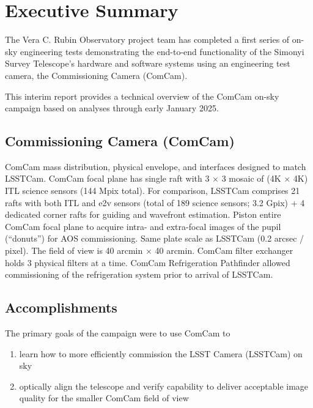 \section{Executive Summary}
\label{sec:summary}

The Vera C. Rubin Observatory project team has completed a first series of on-sky engineering tests demonstrating the end-to-end functionality of the Simonyi Survey Telescope's hardware and software systems using an engineering test camera, the Commissioning Camera (ComCam).

\begin{note}
    This interim report provides a technical overview of the ComCam on-sky campaign based on analyses through early January 2025.
\end{note}

\emph{}

\subsection{Commissioning Camera (ComCam)}

ComCam mass distribution, physical envelope, and interfaces designed to match LSSTCam.
ComCam focal plane has single raft with 3 $\times$ 3 mosaic of (4K $\times$ 4K) ITL science sensors (144 Mpix total).
For comparison, LSSTCam comprises 21 rafts with both ITL and e2v sensors (total of 189 science sensors; 3.2 Gpix) + 4 dedicated corner rafts for guiding and wavefront estimation.
Piston entire ComCam focal plane to acquire intra- and extra-focal images of the pupil (``donuts'') for AOS commissioning.
Same plate scale as LSSTCam (0.2 arcsec / pixel).
The field of view is 40 arcmin $\times$ 40 arcmin.
ComCam filter exchanger holds 3 physical filters at a time.
ComCam Refrigeration Pathfinder allowed commissioning of the refrigeration system prior to arrival of LSSTCam.

\subsection{Accomplishments}

The primary goals of the campaign were to use ComCam to

\begin{enumerate}
    \item learn how to more efficiently commission the LSST Camera (LSSTCam) on sky
    \item optically align the telescope and verify capability to deliver acceptable image quality for the smaller ComCam field of view
\end{enumerate}

